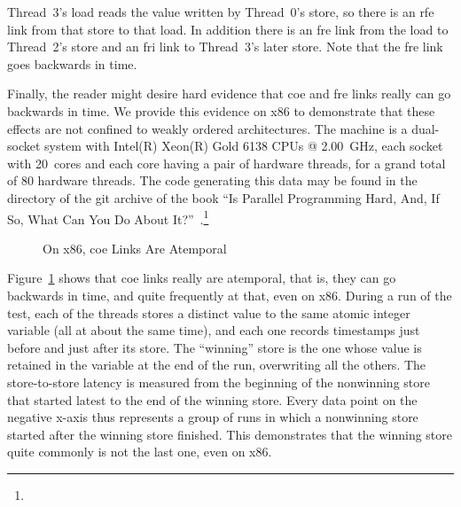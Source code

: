 \documentclass[10]{article}
\begin{document}
Thread~3's load reads the value written by Thread~0's store, so there is
an rfe link from that store to that load.  In addition there is an fre link from
the load to Thread~2's store and an fri link to Thread~3's later store.
Note that the fre link goes backwards in time.

Finally, the reader might desire hard evidence that coe and fre
links really can go backwards in time.
We provide this evidence on x86 to demonstrate that these effects
are not confined to weakly ordered architectures.
The machine is a dual-socket system with
Intel(R) Xeon(R) Gold 6138 CPUs @ 2.00~GHz,
each socket with 20~cores and each core having a pair of hardware
threads, for a grand total of 80 hardware threads.
The code generating this data may be found in the 
directory of the git archive of the book
``Is Parallel Programming Hard, And, If So, What Can You Do About
It?''~\cite{McKenney2018ParallelProgramming-2018-12-08a}.\footnote{
	}

\begin{figure}[tb]
\begin{center}
\caption{On x86, coe Links Are Atemporal}
\label{fig:On x86; coe Links Are Atemporal}
\end{center}
\end{figure}

Figure~\ref{fig:On x86; coe Links Are Atemporal}
shows that coe links really are atemporal, that is, they can go backwards
in time, and quite frequently at that, even on x86.
During a run of the test, each of the threads stores a distinct value to
the same atomic integer variable (all at about the same time), and each
one records timestamps just before and just after its store.
The ``winning'' store is the one whose value is retained in the
variable at the end of the run, overwriting all the others.
The store-to-store latency is measured from the beginning of the
nonwinning store that started latest to the end of the winning store.
Every data point on the negative x-axis thus represents a group of
runs in which a nonwinning store started after the winning store
finished.
This demonstrates that the winning store quite commonly is not the
last one, even on x86.
\end{document}
